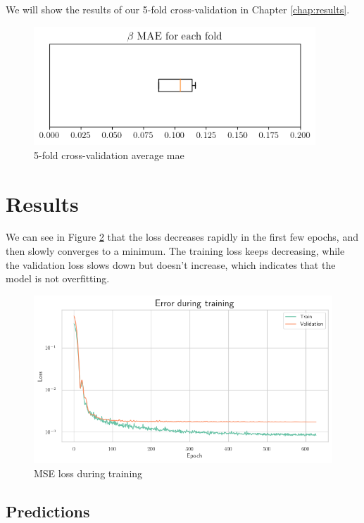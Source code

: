 We will show the results of our 5-fold cross-validation in Chapter
\ref{chap:results}.

\begin{figure}[H]
    \centering
    \includegraphics[width=300pt]{files/average_mae.png}
    \caption{5-fold cross-validation average \gls{mae}}
    \label{fig:cross-validation}
\end{figure}

\section{Results}

We can see in Figure \ref{fig:loss} that the loss decreases rapidly in the
first few epochs, and then slowly converges to a minimum. The training loss
keeps decreasing, while the validation loss slows down but doesn't increase,
which indicates that the model is not overfitting.

\begin{figure}[H]
    \centering
    \includegraphics[width=\textwidth]{files/loss}
    \caption{MSE loss during training}
    \label{fig:loss}
\end{figure}

\subsection{Predictions}

